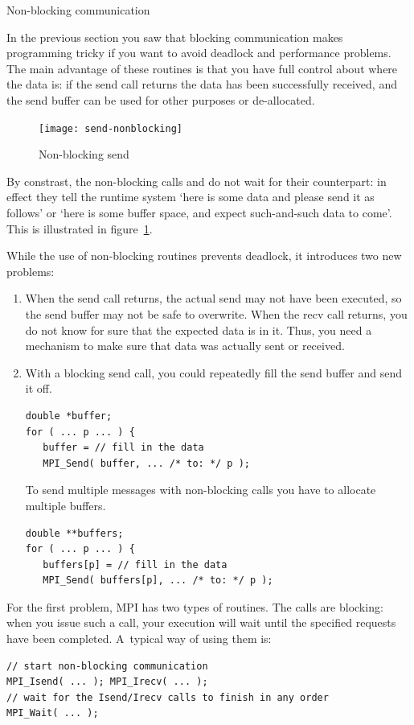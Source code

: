  {Non-blocking communication}

In the previous section you saw that blocking communication makes
programming tricky if you want to avoid deadlock and performance
problems. The main advantage of these routines is that you have full
control about where the data is: if the send call returns
the data has been successfully received, and the send buffer can be used for
other purposes or de-allocated.  

\begin{figure}[ht]
  \texttt{[image: send-nonblocking]}
  \caption{Non-blocking send}
  \label{fig:send-nonblocking}
\end{figure}

By constrast, the non-blocking calls  and 
do not wait for their counterpart: in effect they tell the runtime
system `here is some data and please send it as follows' or `here is
some buffer space, and expect such-and-such data to
come'. 
This is illustrated in figure~\ref{fig:send-nonblocking}.

While the use of non-blocking routines prevents deadlock, it
introduces two new problems:
\begin{enumerate}
\item When the send call returns, the actual send may not have been executed,
  so the send buffer may not be safe to
  overwrite. When the recv call returns, you do not know for sure that
  the expected data is in it. Thus, you need a mechanism to make sure
  that data was actually sent or received.
\item With a blocking send call, you could repeatedly fill the send
  buffer and send it off.
\begin{verbatim}
double *buffer;
for ( ... p ... ) {
   buffer = // fill in the data
   MPI_Send( buffer, ... /* to: */ p );
\end{verbatim}
  To send multiple messages with non-blocking calls
  you have to allocate multiple buffers.
\begin{verbatim}
double **buffers;
for ( ... p ... ) {
   buffers[p] = // fill in the data
   MPI_Send( buffers[p], ... /* to: */ p );
\end{verbatim}
\end{enumerate}

For the first problem, MPI has two types of
routines. The  calls are blocking: when you issue
such a call, your execution will wait until the specified requests
have been completed. A~typical way of using them is:
\begin{verbatim}
// start non-blocking communication
MPI_Isend( ... ); MPI_Irecv( ... );
// wait for the Isend/Irecv calls to finish in any order
MPI_Wait( ... );
\end{verbatim}

